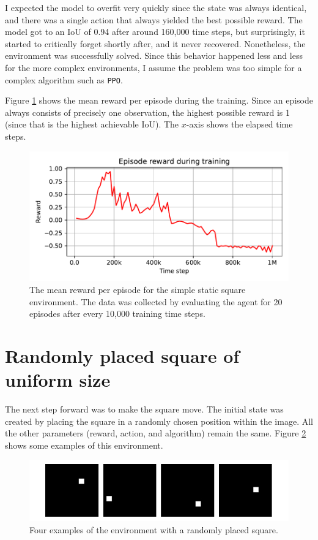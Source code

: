 \documentclass[
  digital,     %
  oneside,     %
  nosansbold,  %
  nocolorbold, %
  lof,         %
  lot,         %
]{fithesis4}
\begin{document}
I expected the model to overfit very quickly since the state was always identical, and there was a single action that always yielded the best possible reward. The model got to an IoU of 0.94 after around 160,000 time steps, but surprisingly, it started to critically forget shortly after, and it never recovered. Nonetheless, the environment was successfully solved. Since this behavior happened less and less for the more complex environments, I assume the problem was too simple for a complex algorithm such as \texttt{PPO}.

Figure \ref{fig:v0_rew} shows the mean reward per episode during the training. Since an episode always consists of precisely one observation, the highest possible reward is 1 (since that is the highest achievable IoU). The $x$-axis shows the elapsed time steps.

\begin{figure}
    \includegraphics[width=1\linewidth]{graphs/v0.pdf}
    \caption{The mean reward per episode for the simple static square environment. The data was collected by evaluating the agent for 20 episodes after every 10,000 training time steps.}
    \label{fig:v0_rew}
\end{figure}



\section{Randomly placed square of uniform size}
The next step forward was to make the square move. The initial state was created by placing the square in a randomly chosen position within the image. All the other parameters (reward, action, and algorithm) remain the same. Figure \ref{fig:env1} shows some examples of this environment.

\begin{figure}
    \includegraphics[width=1\linewidth]{env_examples/env1.pdf}
    \caption{Four examples of the environment with a randomly placed square.}
    \label{fig:env1}
\end{figure}
\end{document}
